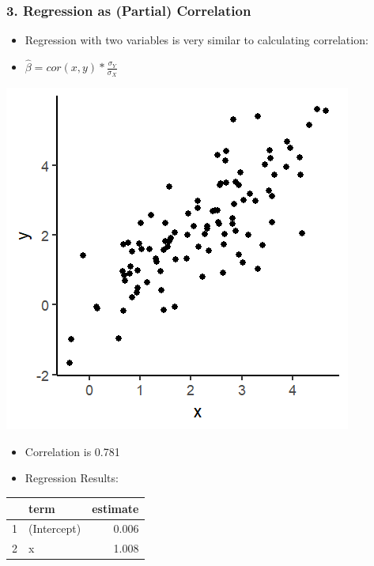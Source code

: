 \documentclass[xcolor=x11names,compress]{beamer}\usepackage[]{graphicx}\usepackage[]{color}
\makeatletter
\def\maxwidth{ %
  \ifdim\Gin@nat@width>\linewidth
    \linewidth
  \else
    \Gin@nat@width
  \fi
}
\newenvironment{knitrout}{}{} %
\renewcommand{\(}{\begin{columns}}
\renewcommand{\)}{\end{columns}}
\newcommand{\<}[1]{\begin{column}{#1}}
\renewcommand{\>}{\end{column}}
\makeatother
\begin{document}
\begin{frame}
\frametitle{3. Regression as (Partial) Correlation}
\begin{itemize}
\item Regression with two variables is very similar to calculating correlation:
\item $\hat{\beta}=cor(x,y) * \frac{\sigma_Y}{\sigma_X}$
\end{itemize}
\begin{multicols}{2}
\begin{knitrout}
\color{fgcolor}
\includegraphics[width=\maxwidth]{figure/corr_regn_fig2-1} 

\end{knitrout}
\columnbreak
\begin{itemize}
\item Correlation is 0.781
\pause
\item Regression Results:
\end{itemize}
\begin{table}[ht]
\centering
\begin{tabular}{rlr}
  \hline
 & term & estimate \\ 
  \hline
1 & (Intercept) & 0.006 \\ 
  2 & x & 1.008 \\ 
   \hline
\end{tabular}
\end{table}

\end{multicols}
\end{frame}
\end{document}
